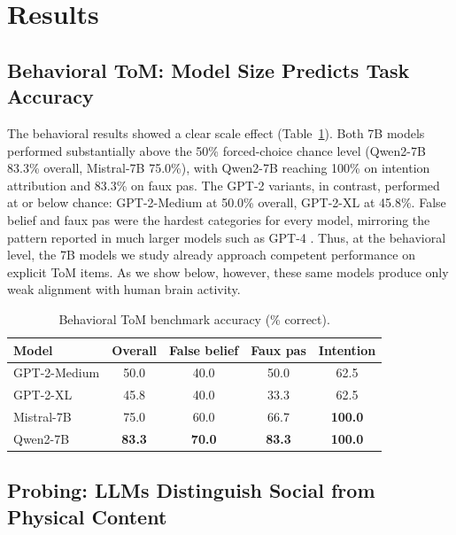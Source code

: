 \documentclass[conference]{IEEEtran}
\begin{document}
\section{Results}

\subsection{Behavioral ToM: Model Size Predicts Task Accuracy}
\label{sec:behavioral}

The behavioral results showed a clear scale effect (Table~\ref{tab:behavioral}). Both 7B models performed substantially above the 50\% forced-choice chance level (Qwen2-7B 83.3\% overall, Mistral-7B 75.0\%), with Qwen2-7B reaching 100\% on intention attribution and 83.3\% on faux pas. The GPT-2 variants, in contrast, performed at or below chance: GPT-2-Medium at 50.0\% overall, GPT-2-XL at 45.8\%. False belief and faux pas were the hardest categories for every model, mirroring the pattern reported in much larger models such as GPT-4 \cite{strachan2024testing}. Thus, at the behavioral level, the 7B models we study already approach competent performance on explicit ToM items. As we show below, however, these same models produce only weak alignment with human brain activity.

\begin{table}[t]
\centering
\caption{Behavioral ToM benchmark accuracy (\% correct).}
\label{tab:behavioral}
\vskip 0.05in
\begin{tabular}{lcccc}
\toprule
Model & Overall & False belief & Faux pas & Intention \\
\midrule
GPT-2-Medium & 50.0 & 40.0 & 50.0 & 62.5 \\
GPT-2-XL     & 45.8 & 40.0 & 33.3 & 62.5 \\
Mistral-7B   & 75.0 & 60.0 & 66.7 & \textbf{100.0} \\
Qwen2-7B     & \textbf{83.3} & \textbf{70.0} & \textbf{83.3} & \textbf{100.0} \\
\bottomrule
\end{tabular}
\end{table}

\subsection{Probing: LLMs Distinguish Social from Physical Content}
\end{document}

